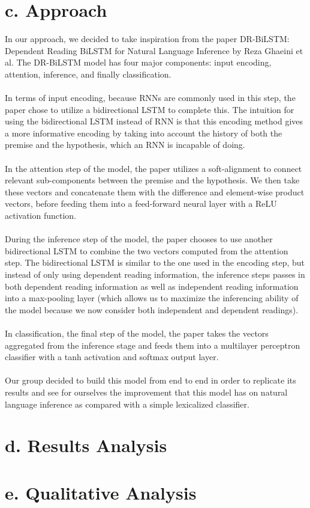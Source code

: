 \documentclass[12pt,letterpaper]{article}
\begin{document}
\section*{c. Approach}
In our approach, we decided to take inspiration from the paper DR-BiLSTM: Dependent Reading BiLSTM for Natural Language Inference by Reza Ghaeini et al.  The DR-BiLSTM model has four major components: input encoding, attention, inference, and finally classification.  \\ \\ 
In terms of input encoding, because RNNs are commonly used in this step, the paper chose to utilize a bidirectional LSTM to complete this. The intuition for using the bidirectional LSTM instead of RNN is that this encoding method gives a more informative encoding by taking into account the history of both the premise and the hypothesis, which an RNN is incapable of doing. \\ \\ 
In the attention step of the model, the paper utilizes a soft-alignment to connect relevant sub-components between the premise and the hypothesis. We then take these vectors and concatenate them with the difference and element-wise product vectors, before feeding them into a feed-forward neural layer with a ReLU activation function. \\ \\
During the inference step of the model, the paper chooses to use another bidirectional LSTM to combine the two vectors computed from the attention step. The bidirectional LSTM is similar to the one used in the encoding step, but instead of only using dependent reading information, the inference steps passes in both dependent reading information as well as independent reading information into a max-pooling layer (which allows us to maximize the inferencing ability of the model because we now consider both independent and dependent readings). \\ \\
In classification, the final step of the model, the paper takes the vectors aggregated from the inference stage and feeds them into a multilayer perceptron classifier with a tanh activation and softmax output layer. \\ \\
Our group decided to build this model from end to end in order to replicate its results and see for ourselves the improvement that this model has on natural language inference as compared with a simple lexicalized classifier. 
\section*{d. Results Analysis}
\section*{e. Qualitative Analysis}
\end{document}
